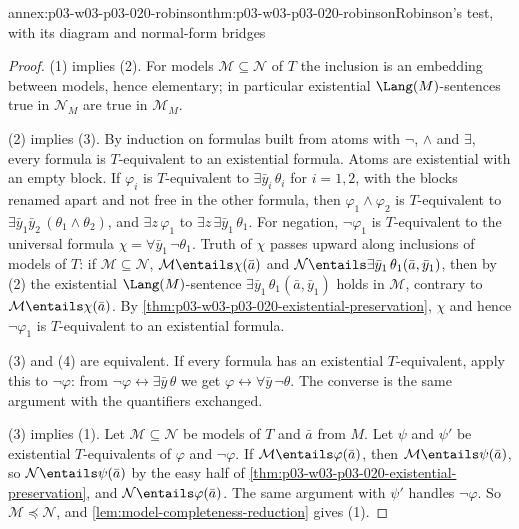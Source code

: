 \begin{annexitem}{annex:p03-w03-p03-020-robinson}{thm:p03-w03-p03-020-robinson}{Robinson's test, with its diagram and normal-form bridges}
\begin{proof}
(1) implies (2). For models \(\mathcal M\subseteq\mathcal N\) of \(T\) the
inclusion is an embedding between models, hence elementary; in particular
existential \(\Lang(M)\)-sentences true in \(\mathcal N_M\) are true in
\(\mathcal M_M\).

(2) implies (3). By induction on formulas built from atoms with \(\neg\),
\(\land\) and \(\exists\), every formula is \(T\)-equivalent to an
existential formula. Atoms are existential with an empty block. If
\(\varphi_i\) is \(T\)-equivalent to \(\exists\bar y_i\,\theta_i\) for
\(i=1,2\), with the blocks renamed apart and not free in the other formula,
then \(\varphi_1\land\varphi_2\) is \(T\)-equivalent to
\(\exists\bar y_1\bar y_2\,(\theta_1\land\theta_2)\), and
\(\exists z\,\varphi_1\) to \(\exists z\,\exists\bar y_1\,\theta_1\). For
negation, \(\neg\varphi_1\) is \(T\)-equivalent to the universal formula
\(\chi=\forall\bar y_1\,\neg\theta_1\). Truth of \(\chi\) passes upward
along inclusions of models of \(T\): if \(\mathcal M\subseteq\mathcal N\),
\(\mathcal M\entails\chi(\bar a)\) and
\(\mathcal N\entails\exists\bar y_1\,\theta_1(\bar a,\bar y_1)\), then by
(2) the existential \(\Lang(M)\)-sentence
\(\exists\bar y_1\,\theta_1(\bar a,\bar y_1)\) holds in \(\mathcal M\),
contrary to \(\mathcal M\entails\chi(\bar a)\). By
\cref{thm:p03-w03-p03-020-existential-preservation}, \(\chi\) and hence
\(\neg\varphi_1\) is \(T\)-equivalent to an existential formula.

(3) and (4) are equivalent. If every formula has an existential
\(T\)-equivalent, apply this to \(\neg\varphi\): from
\(\neg\varphi\leftrightarrow\exists\bar y\,\theta\) we get
\(\varphi\leftrightarrow\forall\bar y\,\neg\theta\). The converse is the
same argument with the quantifiers exchanged.

(3) implies (1). Let \(\mathcal M\subseteq\mathcal N\) be models of \(T\)
and \(\bar a\) from \(M\). Let \(\psi\) and \(\psi'\) be existential
\(T\)-equivalents of \(\varphi\) and \(\neg\varphi\). If
\(\mathcal M\entails\varphi(\bar a)\), then
\(\mathcal M\entails\psi(\bar a)\), so \(\mathcal N\entails\psi(\bar a)\)
by the easy half of \cref{thm:p03-w03-p03-020-existential-preservation},
and \(\mathcal N\entails\varphi(\bar a)\). The same argument with
\(\psi'\) handles \(\neg\varphi\). So \(\mathcal M\preccurlyeq\mathcal N\),
and \cref{lem:model-completeness-reduction} gives (1).


\end{proof}
\end{annexitem}
